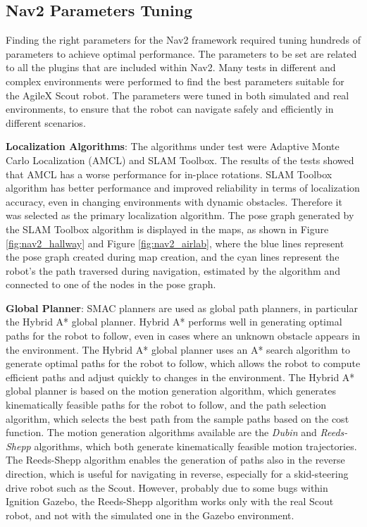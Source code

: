 \subsection{Nav2 Parameters Tuning}

Finding the right parameters for the Nav2 framework required tuning hundreds of parameters to achieve optimal performance.
The parameters to be set are related to all the plugins that are included within Nav2. 
Many tests in different and complex environments were performed to find the best parameters
suitable for the AgileX Scout robot. The parameters were tuned in both simulated
and real environments, to ensure that the robot can navigate safely and efficiently in different scenarios.

\textbf{Localization Algorithms}:
The algorithms under test were Adaptive Monte Carlo Localization (AMCL) and SLAM Toolbox.
The results of the tests showed that AMCL has a worse performance for in-place rotations.
SLAM Toolbox algorithm has better performance and improved reliability in terms of localization accuracy,
even in changing environments with dynamic obstacles. Therefore it was selected as the primary localization algorithm.
The pose graph generated by the SLAM Toolbox algorithm
is displayed in the maps, as shown in Figure \ref{fig:nav2_hallway} and Figure \ref{fig:nav2_airlab}, where the
blue lines represent the pose graph created during map creation, and the cyan lines represent the robot's
the path traversed during navigation, estimated by the algorithm and connected to one of the nodes in the pose graph.

\textbf{Global Planner}:
SMAC planners \cite{macenski2024smac} are used as global path planners, in particular the Hybrid A* global planner.
Hybrid A* performs well in generating optimal paths for the robot to follow, 
even in cases where an unknown obstacle appears in the environment. The Hybrid A*
global planner uses an A* search algorithm to generate optimal paths for the robot to follow, which allows the robot
to compute efficient paths and adjust quickly to changes in the environment. The Hybrid A* global planner is based on
the motion generation algorithm, which generates kinematically feasible paths for the robot to follow, and the path selection
algorithm, which selects the best path from the sample paths based on the cost function.
The motion generation algorithms available are the \textit{Dubin} and \textit{Reeds-Shepp} algorithms, which both generate
kinematically feasible motion trajectories. The Reeds-Shepp algorithm enables
the generation of paths also in the reverse direction, which is useful for navigating in reverse, especially for
a skid-steering drive robot such as the Scout. However, probably due to some bugs within Ignition Gazebo,
the Reeds-Shepp algorithm works only with the real Scout robot, and not with the simulated one in the Gazebo environment.


